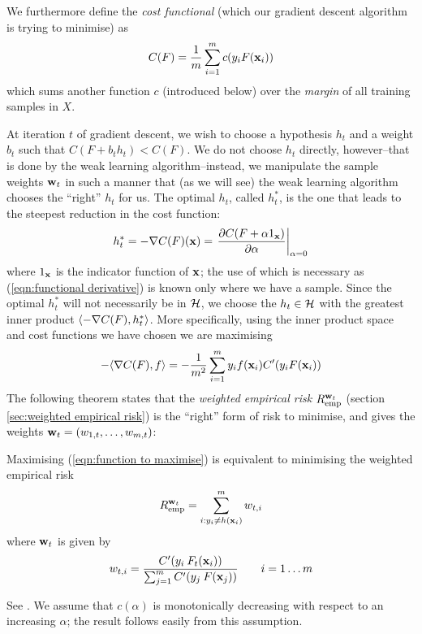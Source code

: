 We furthermore define the \emph{cost functional} (which our gradient
descent algorithm is trying to minimise) as
%
\begin{equation}
\label{eqn:gradient descent cost functional}
C(F) = \frac{1}{m} \sum_{i=1}^{m} c(y_i F(\mathbf{x}_i))
\end{equation}
%
which sums another function $c$ (introduced below) over the
\emph{margin} of all training samples in $X$.

At iteration $t$ of gradient descent, we wish to choose a hypothesis $h_t$ and
a weight $b_t$ such that $C(F + b_t h_t) < C(F)$.  We do not choose
$h_t$ directly, however--that is done by the weak learning
algorithm--instead, we manipulate the sample weights $\mathbf{w}_t$ in such
a manner that (as we will see) the weak learning algorithm chooses the
``right'' $h_t$ for us.  The optimal $h_t$, called $h_t^{\ast}$, is
the one that leads to the steepest reduction in the cost function:
%
\begin{equation}
h_t^{\ast} = -\nabla C(F)(\mathbf{x}) = \left. \frac{\partial C(F + \alpha
1_{\mathbf{x}})}{\partial \alpha} \right|_{\alpha = 0}
\label{eqn:functional derivative}
\end{equation}
%
where $1_{\mathbf{x}}$ is the indicator function of $\mathbf{x}$; the use of which
is necessary as (\ref{eqn:functional derivative}) is known only where
we have a sample.  Since the optimal $h_t^{\ast}$ will not necessarily
be in $\mathcal{H}$, we choose the $h_t \in \mathcal{H}$ with the greatest inner
product $\langle {-\nabla C(F)} , {h_t^{\ast}} \rangle$.  More specifically, using the
inner product space and cost functions we have chosen we are maximising 
%
\begin{equation}
- \langle {\nabla C(F)} , {f} \rangle = - \frac{1}{m^2} \sum_{i=1}^{m} y_i f(\mathbf{x}_i)
  C'(y_i F(\mathbf{x}_i))
\label{eqn:function to maximise}
\end{equation}
%
The following theorem states that the \emph{weighted empirical risk}
$R_{\mathrm{emp}}^{\mathbf{w}_t}$ (section \ref{sec:weighted empirical risk}) is
the ``right'' form of risk to minimise, and gives the weights
$\mathbf{w}_t = (w_{1,t}, \ldots, w_{m,t})$:

\begin{theorem}
\label{thm:gradient descent weights and direction}
Maximising (\ref{eqn:function to maximise}) is equivalent to
minimising the weighted empirical risk
%
\begin{equation}
R_{\mathrm{emp}}^{\mathbf{w}_t} = \sum_{i:y_i \neq h(\mathbf{x}_i)}^{m} w_{t,i}
\end{equation}
%
where $\mathbf{w}_{t}$ is given by
%
\begin{equation}
w_{t,i} = \frac{C'(y_i \: F_t (\mathbf{x}_i))}{\sum_{j=1}^{m} C'(y_j \:
F(\mathbf{x}_j))} \qquad i=1 \ldots m
\label{eqn:gradient sample weights}
\end{equation}
\end{theorem}
\proof See \cite{Mason99}.  We assume that $c(\alpha)$ is
monotonically decreasing with respect to an increasing $\alpha$; the
result follows easily from this assumption.

